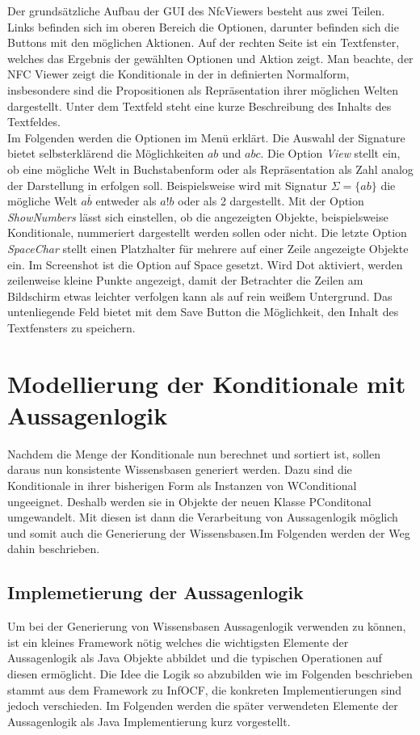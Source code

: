 \documentclass[12pt,a4paper]{article}
\begin{document}
Der grundsätzliche Aufbau der GUI des NfcViewers besteht aus zwei Teilen. Links befinden sich im oberen Bereich die Optionen, darunter befinden sich die Buttons mit den möglichen Aktionen. Auf der rechten Seite ist ein Textfenster, welches das Ergebnis der gewählten Optionen und Aktion zeigt. Man beachte, der NFC Viewer zeigt die Konditionale in der in \cite{beierle19} definierten Normalform, insbesondere sind die Propositionen als Repräsentation ihrer möglichen Welten dargestellt. Unter dem Textfeld steht eine kurze Beschreibung des Inhalts des Textfeldes. \\
Im Folgenden werden die Optionen im Menü erklärt. Die Auswahl der Signature bietet selbsterklärend die Möglichkeiten $ab$ und $abc$. Die Option \textit{View} stellt ein, ob eine mögliche Welt in Buchstabenform oder als Repräsentation als Zahl analog der Darstellung in \cite{beierle19} erfolgen soll. Beispielsweise wird mit Signatur $\Sigma=\{ab\}$ die mögliche Welt $a \overline{b}$ entweder als $a!b$ oder als 2 dargestellt. Mit der Option \textit{ShowNumbers} lässt sich einstellen, ob die angezeigten Objekte, beispielsweise Konditionale, nummeriert dargestellt werden sollen oder nicht. Die letzte Option \textit{SpaceChar} stellt einen Platzhalter für mehrere auf einer Zeile angezeigte Objekte ein. Im Screenshot ist die Option auf Space gesetzt. Wird Dot aktiviert, werden zeilenweise kleine Punkte angezeigt, damit der Betrachter die Zeilen am Bildschirm etwas leichter verfolgen kann als auf rein weißem Untergrund. Das untenliegende Feld bietet mit dem Save Button die Möglichkeit, den Inhalt des Textfensters zu speichern.



\section{Modellierung der Konditionale mit Aussagenlogik}
Nachdem die Menge der Konditionale nun berechnet und sortiert ist, sollen daraus nun konsistente Wissensbasen generiert werden. Dazu sind die Konditionale in ihrer bisherigen Form als Instanzen von WConditional ungeeignet. Deshalb werden sie in Objekte der neuen Klasse PConditonal umgewandelt. Mit diesen ist dann die Verarbeitung von Aussagenlogik möglich und somit auch die Generierung der Wissensbasen.Im Folgenden werden der Weg dahin beschrieben.




\subsection{Implemetierung der Aussagenlogik}
\label{sec:logic}
Um bei der Generierung von Wissensbasen Aussagenlogik verwenden zu können, ist ein kleines Framework nötig welches die wichtigsten Elemente der Aussagenlogik als Java Objekte abbildet und die typischen Operationen auf diesen ermöglicht. Die Idee die Logik so abzubilden wie im Folgenden beschrieben stammt aus dem Framework zu InfOCF, die konkreten Implementierungen sind jedoch verschieden. Im Folgenden werden die später verwendeten Elemente der Aussagenlogik als Java Implementierung kurz vorgestellt. \\
\end{document}
